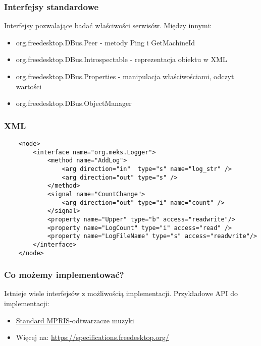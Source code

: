 

\begin{frame}
    \frametitle{Interfejsy standardowe}
    Interfejsy pozwalające badać właściwości 
    serwisów. Między innymi:
    \begin{itemize}
        \item org.freedesktop.DBus.Peer - metody Ping i GetMachineId
        \item org.freedesktop.DBus.Introspectable - reprezentacja obiektu w XML
        \item org.freedesktop.DBus.Properties - manipulacja właściwościami, odczyt wartości
        \item org.freedesktop.DBus.ObjectManager
    \end{itemize}
\end{frame}

\begin{frame}[fragile]
    \frametitle{XML}
    \lstset{
    basicstyle=\tiny\ttfamily, 
    breaklines=true,           
    breakatwhitespace=true,    
    stepnumber=1               
}
    \begin{lstlisting}
    <node>
        <interface name="org.meks.Logger">
            <method name="AddLog">
                <arg direction="in"  type="s" name="log_str" />
                <arg direction="out" type="s" />
            </method>
            <signal name="CountChange">
                <arg direction="out" type="i" name="count" />
            </signal>
            <property name="Upper" type="b" access="readwrite"/>
            <property name="LogCount" type="i" access="read" />
            <property name="LogFileName" type="s" access="readwrite"/>
        </interface>
    </node>

    \end{lstlisting}
\end{frame}


\begin{frame}
    \frametitle{Co możemy implementować?}
    Istnieje wiele interfejsów z możliwością implementacji.
    Przykładowe API do implementacji:
    \begin{itemize}
        \item \href{https://specifications.freedesktop.org/mpris-spec/latest/}{Standard MPRIS}-odtwarzacze muzyki
        \item Więcej na: \href{https://specifications.freedesktop.org/}{https://specifications.freedesktop.org/}
    \end{itemize}
\end{frame}


